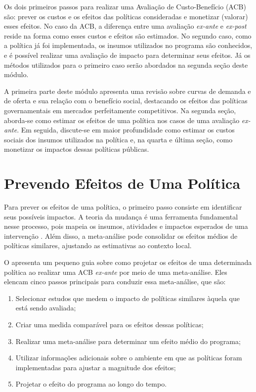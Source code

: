 \documentclass[12pt,letterpaper]{article}
\newcommand{\1}{\mathbbm{1}}
\numberwithin{equation}{section}
\begin{document}
Os dois primeiros passos para realizar uma Avaliação de Custo-Benefício (ACB) são: prever os custos e os efeitos das políticas consideradas e monetizar (valorar) esses efeitos. No caso da ACB, a diferença entre uma avaliação \textit{ex-ante} e \textit{ex-post} reside na forma como esses custos e efeitos são estimados. No segundo caso, como a política já foi implementada, os insumos utilizados no programa são conhecidos, e é possível realizar uma avaliação de impacto para determinar seus efeitos. Já os métodos utilizados para o primeiro caso serão abordados na segunda seção deste módulo.

A primeira parte deste módulo apresenta uma revisão sobre curvas de demanda e de oferta e sua relação com o benefício social, destacando os efeitos das políticas governamentais em mercados perfeitamente competitivos. Na segunda seção, aborda-se como estimar os efeitos de uma política nos casos de uma avaliação \textit{ex-ante}. Em seguida, discute-se em maior profundidade como estimar os custos sociais dos insumos utilizados na política e, na quarta e última seção, como monetizar os impactos dessas políticas públicas.

\section{Prevendo Efeitos de Uma Política}
\label{sec:prevendoefeitos}

Para prever os efeitos de uma política, o primeiro passo consiste em identificar seus possíveis impactos. A teoria da mudança é uma ferramenta fundamental nesse processo, pois mapeia os insumos, atividades e impactos esperados de uma intervenção \cite{avaliacao_politicas_publicas}. Além disso, a meta-análise pode consolidar os efeitos médios de políticas similares, ajustando as estimativas ao contexto local.

O \textcite{wsipp_estimating_nodate} apresenta um pequeno guia sobre como projetar os efeitos de uma determinada política ao realizar uma ACB \textit{ex-ante} por meio de uma meta-análise. Eles elencam cinco passos principais para conduzir essa meta-análise, que são:

\begin{enumerate}
    \item Selecionar estudos que medem o impacto de políticas similares àquela que está sendo avaliada;
    \item Criar uma medida comparável para os efeitos dessas políticas;
    \item Realizar uma meta-análise para determinar um efeito médio do programa;
    \item Utilizar informações adicionais sobre o ambiente em que as políticas foram implementadas para ajustar a magnitude dos efeitos;
    \item Projetar o efeito do programa ao longo do tempo.
\end{enumerate}
\end{document}
